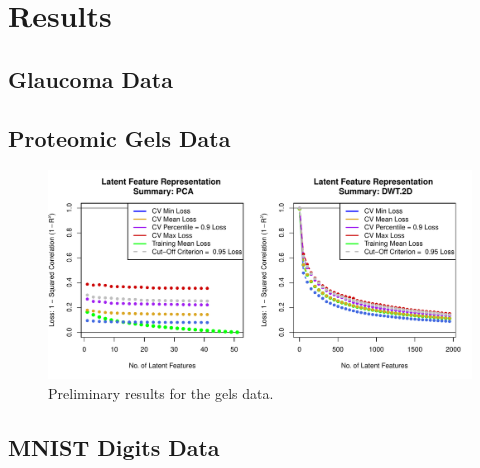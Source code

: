 \section{Results}\label{sec:results}

\subsection{Glaucoma Data}
\subsection{Proteomic Gels Data}

\begin{figure}
    \centering
    \includegraphics[width=1\linewidth]{figures/initial-gels.pdf}
    \caption{Preliminary results for the gels data.}
    \label{fig:enter-label}
\end{figure}
\subsection{MNIST Digits Data}